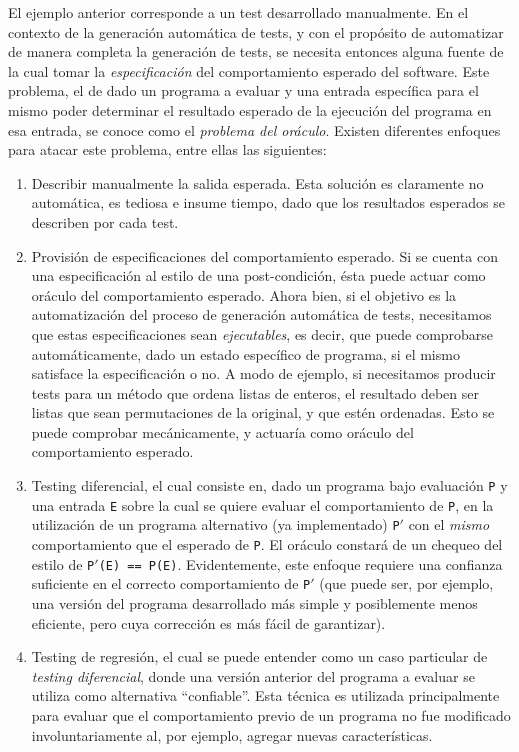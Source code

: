 El ejemplo anterior corresponde a un test desarrollado manualmente. En el contexto de la generaci\'on autom\'atica de tests, y con el prop\'osito de automatizar de manera completa la generaci\'on de tests, se necesita entonces alguna fuente de la cual tomar la \emph{especificaci\'on} del comportamiento esperado del software. Este problema, el de dado un programa a evaluar y una entrada espec\'ifica para el mismo poder determinar el resultado esperado de la ejecuci\'on del programa en esa entrada, se conoce como el \emph{problema del or\'aculo}. Existen diferentes enfoques para atacar este problema, entre ellas las siguientes: 
\begin{enumerate}
	\item Describir manualmente la salida esperada. Esta soluci\'on es claramente no autom\'atica, es tediosa e insume tiempo, dado que los resultados esperados se describen por cada test.
	
    \item Provisi\'on de especificaciones del comportamiento esperado. Si se cuenta con una especificaci\'on al estilo de una post-condici\'on, \'esta puede actuar como or\'aculo del comportamiento esperado. Ahora bien, si el objetivo es la automatizaci\'on del proceso de generaci\'on autom\'atica de tests, necesitamos que estas especificaciones sean \emph{ejecutables}, es decir, que puede comprobarse autom\'aticamente, dado un estado espec\'ifico de programa, si el mismo satisface la especificaci\'on o no. A modo de ejemplo, si necesitamos producir tests para un m\'etodo que ordena listas de enteros, el resultado deben ser listas que sean permutaciones de la original, y que est\'en ordenadas. Esto se puede comprobar mec\'anicamente, y actuar\'ia como or\'aculo del comportamiento esperado. 
	
	\item Testing diferencial, el cual consiste en, dado un programa bajo evaluaci\'on \texttt{P} y una entrada \texttt{E} sobre la cual se quiere evaluar el comportamiento de \texttt{P}, en la utilizaci\'on de un programa alternativo (ya implementado) \texttt{P$\prime$} con el \emph{mismo} comportamiento que el esperado de \texttt{P}. El or\'aculo constar\'a de un chequeo del estilo de \texttt{P$\prime$(E) == P(E)}. Evidentemente, este enfoque requiere una confianza suficiente en el correcto comportamiento de \texttt{P$\prime$} (que puede ser, por ejemplo, una versi\'on del programa desarrollado m\'as simple y posiblemente menos eficiente, pero cuya correcci\'on es m\'as f\'acil de garantizar). 
	
	\item Testing de regresi\'on, el cual se puede entender como un caso particular de \emph{testing diferencial}, donde una versi\'on anterior del programa a evaluar se utiliza como alternativa ``confiable''. Esta t\'ecnica es utilizada principalmente para evaluar que el comportamiento previo de un programa no fue modificado involuntariamente al, por ejemplo, agregar nuevas caracter\'isticas.
	
\end{enumerate}

